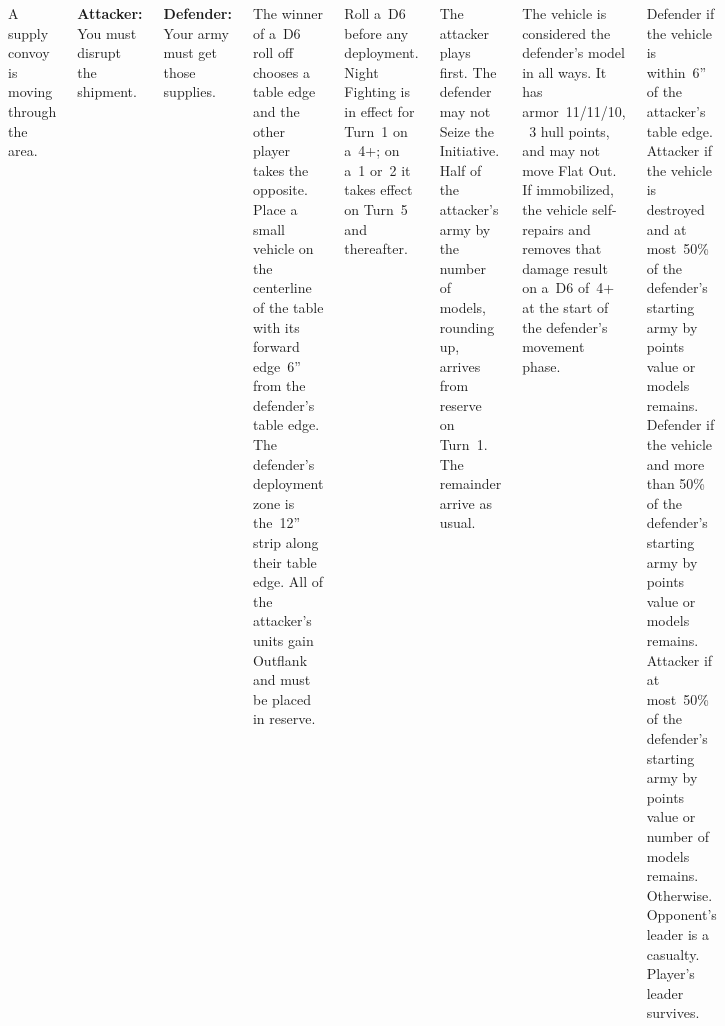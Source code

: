 
\begin{columns}

A supply convoy is moving through the area.

{\bf Attacker:} You must disrupt the shipment.

{\bf Defender:} Your army must get those supplies.


%

The winner of a~D6 roll off chooses a table edge and the other player
takes the opposite.  Place a small vehicle on the centerline of the
table with its forward edge~6'' from the defender's table edge.  The
defender's deployment zone is the~12'' strip along their table edge.
All of the attacker's units gain Outflank and must be placed in
reserve.

Roll a~D6 before any deployment.  Night Fighting is in effect for
Turn~1 on a~4+; on a~1 or~2 it takes effect on Turn~5 and thereafter.

%

The attacker plays first.  The defender may not Seize the Initiative.
Half of the attacker's army by the number of models, rounding up,
arrives from reserve on Turn~1.  The remainder arrive as usual.

The vehicle is considered the defender's model in all ways.  It has
armor~11/11/10, ~3 hull points, and may not move Flat Out.  If
immobilized, the vehicle self-repairs and removes that damage result
on a~D6 of~4+ at the start of the defender's movement phase.

\scoringbox%
{Defender if the vehicle is within~6'' of the attacker's table edge.
  Attacker if the vehicle is destroyed and at most~50\% of the
  defender's starting army by points value or models remains.}%
{Defender if the vehicle and more than 50\% of the defender's starting
  army by points value or models remains.  Attacker if at most~50\% of
  the defender's starting army by points value or number of models
  remains.}%
{Otherwise.}%
{Opponent's leader is a casualty.}%
{Player's leader survives.}

\end{columns}
